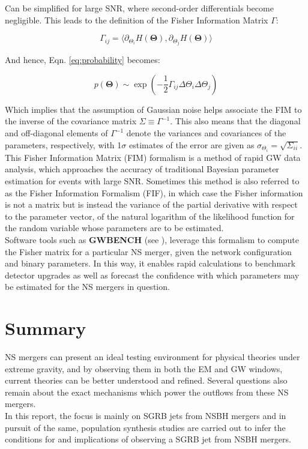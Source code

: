     Can be simplified for large SNR, where second-order differentials become negligible.
    This leads to the definition of the Fisher Information Matrix $\Gamma$:

    \begin{equation}
        \Gamma_{ij} =
            \langle
                \partial_{\Theta_i} H(\mathbf{\Theta}),
                \partial_{\Theta_j} H(\mathbf{\Theta})
            \rangle
    \end{equation}

    And hence, Eqn. \ref{eq:probability} becomes:

    \begin{equation}
        p(\mathbf{\Theta}) \sim
            \exp\left(
                         -\dfrac{1}{2}
                          \Gamma_{ij}
                          \Delta\Theta_i
                          \Delta\Theta_j
                \right)
    \end{equation}

    Which implies that the assumption of Gaussian noise helps associate the FIM to the
    inverse of the covariance matrix $\Sigma \equiv \Gamma^{-1}$. This also means that
    the diagonal and off-diagonal elements of $\Gamma^{-1}$ denote the variances and
    covariances of the parameters, respectively, with 1$\sigma$ estimates of the error
    are given as $\sigma_{\Theta_i} = \sqrt{\Sigma_{ii}}$.\\
    This Fisher Information Matrix (FIM) formalism is a method of rapid GW data
    analysis, which approaches the accuracy of traditional Bayesian parameter estimation
    for events with large SNR.  Sometimes this method is also referred to as the Fisher
    Information Formalism (FIF), in which case the Fisher information is not a matrix
    but is instead the variance of the partial derivative with respect to the parameter
    vector, of the natural logarithm of the likelihood function for the random variable
    whose parameters are to be estimated.\\
    Software tools such as \textbf{GWBENCH} (see \cite{borhanian_2020}), leverage this
    formalism to compute the Fisher matrix for a particular NS merger, given the network
    configuration and binary parameters. In this way, it enables rapid calculations to
    benchmark detector upgrades as well as forecast the confidence with which parameters
    may be estimated for the NS mergers in question.\\

\section{Summary}

    NS mergers can present an ideal testing environment for physical theories under
    extreme gravity, and by observing them in both the EM and GW windows, current
    theories can be better understood and refined. Several questions also remain about
    the exact mechanisms which power the outflows from these NS mergers.\\
    In this report, the focus is mainly on SGRB jets from NSBH mergers and in pursuit of
    the same, population synthesis studies are carried out to infer the conditions for
    and implications of observing a SGRB jet from NSBH mergers.
